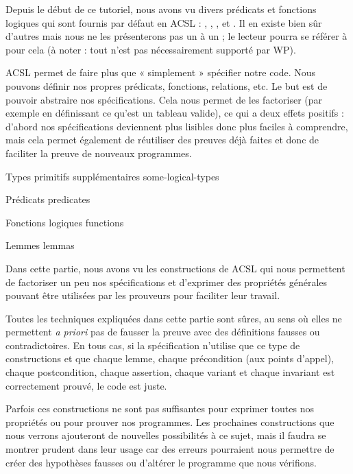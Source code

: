 
Depuis le début de ce tutoriel, nous avons vu divers prédicats et fonctions 
logiques qui sont fournis par défaut en ACSL : , ,
,  et . Il en existe bien sûr d'autres mais 
nous ne les présenterons pas un à un ; le lecteur pourra se référer à 
pour cela (à noter : tout n'est pas nécessairement supporté par WP).



ACSL permet de faire plus que « simplement » spécifier notre code. Nous 
pouvons définir nos propres prédicats, fonctions, relations, etc. Le but est de
pouvoir abstraire nos spécifications. Cela nous permet de les factoriser (par 
exemple en définissant ce qu'est un tableau valide), ce qui a deux effets 
positifs : d'abord nos spécifications deviennent plus lisibles donc 
plus faciles à comprendre, mais cela permet également de réutiliser des preuves
déjà faites et donc de faciliter la preuve de nouveaux programmes.


\begin{levelTwo}
  {Types primitifs supplémentaires}
  {some-logical-types}
\end{levelTwo}

\begin{levelTwo}
  {Prédicats}
  {predicates}
\end{levelTwo}

\begin{levelTwo}
  {Fonctions logiques}
  {functions}
\end{levelTwo}

\begin{levelTwo}
  {Lemmes}
  {lemmas}
\end{levelTwo}



\horizontalLine



Dans cette partie, nous avons vu les constructions de ACSL qui nous permettent 
de factoriser un peu nos spécifications et d'exprimer des propriétés générales 
pouvant être utilisées par les prouveurs pour faciliter leur travail.



Toutes les techniques expliquées dans cette partie sont sûres, au sens où 
elles ne permettent \textit{a priori} pas de fausser la preuve avec des définitions 
fausses ou contradictoires. En tous cas, si la spécification n'utilise que ce
type de constructions et que chaque lemme, chaque précondition (aux points 
d'appel), chaque postcondition, chaque assertion, chaque variant et chaque 
invariant est correctement prouvé, le code est juste.



Parfois ces constructions ne sont pas suffisantes pour exprimer toutes nos 
propriétés ou pour prouver nos programmes. Les prochaines constructions que nous
verrons ajouteront de nouvelles possibilités à ce sujet, mais il 
faudra se montrer prudent dans leur usage car des erreurs pourraient nous 
permettre de créer des hypothèses fausses ou d'altérer le programme que nous 
vérifions.
